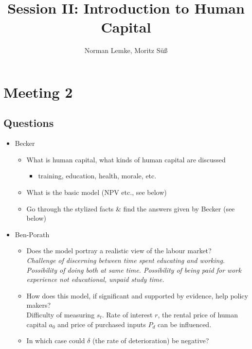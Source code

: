 \documentclass[12pt,a4paper]{article}
\author{Norman Lemke, Moritz Süß}
\begin{document}
  \title{Session II: Introduction to Human Capital}
  \maketitle
  \tableofcontents
  \thispagestyle{empty}
  \pagebreak


  \section{Meeting 2} %
  \subsection{Questions} %
  \begin{itemize}
    \item Becker
      \begin{itemize}
        \item What is human capital, what kinds of human capital are discussed
          \begin{itemize}
            \item training, education, health, morale, etc.
          \end{itemize}
        \item What is the basic model (NPV etc., see below)
        \item Go through the stylized facts \& find the answers given by Becker (see below)
      \end{itemize}
    \item Ben-Porath
	  \begin{itemize}
	    \item Does the model portray a realistic view of the labour market? \\
	      \emph{Challenge of discerning between time spent educating and working. Possibility of doing both at same time. Possibility of being paid for work experience not educational, unpaid study time.}
	    \item How does this model, if significant and supported by evidence, help policy makers? \\
	      Difficulty of measuring $s_t$. Rate of interest $r$, the rental price of human capital $a_0$ and price of purchased inputs $P_d$ can be influenced.
	    \item In which case could $\delta$ (the rate of deterioration) be negative?
	  \end{itemize}
    

\end{itemize}
\end{document}
